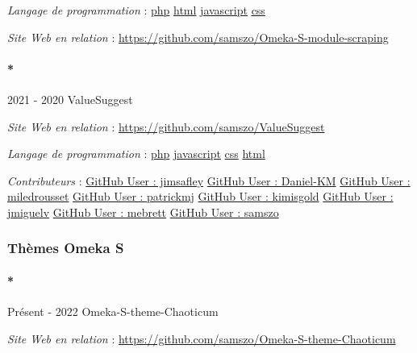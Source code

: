 \documentclass[
  a4paper,
  DIV=11,
  numbers=noendperiod]{scrreprt}
\let\oldparagraph\paragraph
\renewcommand{\paragraph}[1]{\oldparagraph{#1}\mbox{}}
\begin{document}
\emph{Langage de programmation} :
\href{http://localhost/samszo/omk/s/fiches/item/108369}{php}
\href{http://localhost/samszo/omk/s/fiches/item/96621}{html}
\href{http://localhost/samszo/omk/s/fiches/item/89711}{javascript}
\href{http://localhost/samszo/omk/s/fiches/item/102418}{css}

\emph{Site Web en relation} :
\url{https://github.com/samszo/Omeka-S-module-scraping}

\paragraph*{2021 - 2020 ValueSuggest}\label{valuesuggest}

\emph{Site Web en relation} :
\url{https://github.com/samszo/ValueSuggest}

\emph{Langage de programmation} :
\href{http://localhost/samszo/omk/s/fiches/item/108369}{php}
\href{http://localhost/samszo/omk/s/fiches/item/89711}{javascript}
\href{http://localhost/samszo/omk/s/fiches/item/102418}{css}
\href{http://localhost/samszo/omk/s/fiches/item/96621}{html}

\emph{Contributeurs} :
\href{http://localhost/samszo/omk/s/fiches/item/301715}{GitHub User :
jimsafley}
\href{http://localhost/samszo/omk/s/fiches/item/301717}{GitHub User :
Daniel-KM}
\href{http://localhost/samszo/omk/s/fiches/item/301719}{GitHub User :
miledrousset}
\href{http://localhost/samszo/omk/s/fiches/item/301721}{GitHub User :
patrickmj}
\href{http://localhost/samszo/omk/s/fiches/item/301723}{GitHub User :
kimisgold}
\href{http://localhost/samszo/omk/s/fiches/item/301725}{GitHub User :
jmiguelv} \href{http://localhost/samszo/omk/s/fiches/item/301727}{GitHub
User : mebrett}
\href{http://localhost/samszo/omk/s/fiches/item/300735}{GitHub User :
samszo}

\subsubsection{Thèmes Omeka S}\label{sec-item301729}

\paragraph*{Présent - 2022
Omeka-S-theme-Chaoticum}\label{sec-item301865}

\emph{Site Web en relation} :
\url{https://github.com/samszo/Omeka-S-theme-Chaoticum}
\end{document}

